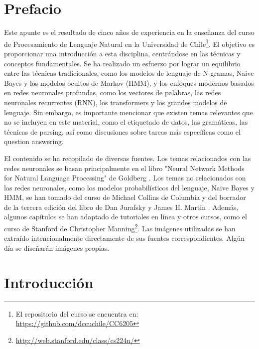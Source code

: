 \documentclass[11pt,fleqn]{book} %
\begin{document}
\chapter*{Prefacio}
Este apunte es el resultado de cinco años de experiencia en la enseñanza del curso de Procesamiento de Lenguaje Natural en la Universidad de Chile\footnote{El repositorio del curso se encuentra en: \url{https://github.com/dccuchile/CC6205}}. El objetivo es proporcionar una introducción a esta disciplina, centrándose en las técnicas y conceptos fundamentales. Se ha realizado un esfuerzo por lograr un equilibrio entre las técnicas tradicionales, como los modelos de lenguaje de N-gramas, Naive Bayes y los modelos ocultos de Markov (HMM), y los enfoques modernos basados en redes neuronales profundas, como los vectores de palabras, las redes neuronales recurrentes (RNN), los transformers y los grandes modelos de lenguaje. Sin embargo, es importante mencionar que existen temas relevantes que no se incluyen en este material, como el etiquetado de datos, las gramáticas, las técnicas de parsing, así como discusiones sobre tareas más específicas como el question answering.

El contenido se ha recopilado de diversas fuentes. Los temas relacionados con las redes neuronales se basan principalmente en el libro "Neural Network Methods for Natural Language Processing" de Goldberg \cite{goldberg2017neural}. Los temas no relacionados con las redes neuronales, como los modelos probabilísticos del lenguaje, Naive Bayes y HMM, se han tomado del curso de Michael Collins de Columbia \cite{collins2013language} y del borrador de la tercera edición del libro de Dan Jurafsky y James H. Martin \cite{JurafskyBook}. Además, algunos capítulos se han adaptado de tutoriales en línea y otros cursos, como el curso de Stanford de Christopher Manning\footnote{\url{http://web.stanford.edu/class/cs224n/}}. Las imágenes utilizadas se han extraído intencionalmente directamente de sus fuentes correspondientes. Algún día se diseñarán imágenes propias.



\chapter{Introducción}
\label{cap_intro}

\end{document}
